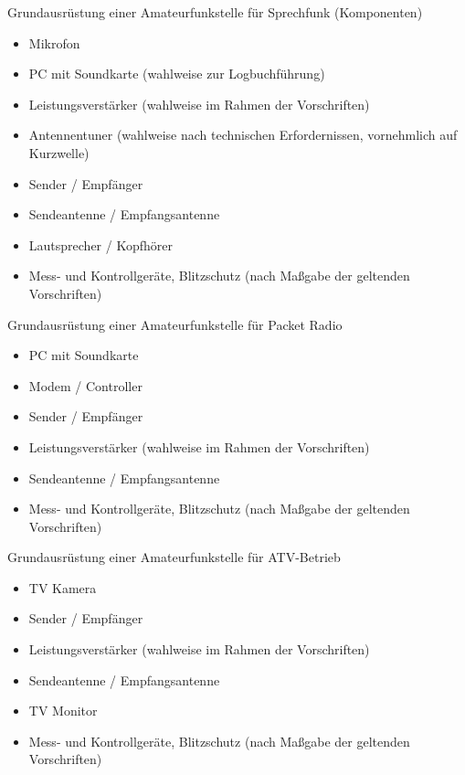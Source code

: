 \documentclass[avery5371,grid,frame,a4paper]{flashcards}
\newcommand{\card}[3]{
  \begin{flashcard}[{\chap} -- #1]{#2}#3\end{flashcard}
}
\begin{document}
\card{38}{Grundausrüstung einer Amateurfunkstelle für Sprechfunk (Komponenten)}{
  \footnotesize
  \begin{minipage}{0.49\textwidth}
    \begin{itemize}
      \item Mikrofon
      \item PC mit Soundkarte (wahlweise zur Logbuchführung)
      \item Leistungsverstärker (wahlweise im Rahmen der Vorschriften)
      \item Antennentuner (wahlweise nach technischen Erfordernissen, vornehmlich auf Kurzwelle)
    \end{itemize}
  \end{minipage}
  \begin{minipage}{0.5\textwidth}
    \begin{itemize}
      \item Sender / Empfänger
      \item Sendeantenne / Empfangsantenne
      \item Lautsprecher / Kopfhörer
      \item Mess- und Kontrollgeräte, Blitzschutz (nach Maßgabe der geltenden Vorschriften)
    \end{itemize}
  \end{minipage}
}
\card{39}{Grundausrüstung einer Amateurfunkstelle für Packet Radio}{
  \begin{itemize}
    \item PC mit Soundkarte
    \item Modem / Controller
    \item Sender / Empfänger
    \item Leistungsverstärker (wahlweise im Rahmen der Vorschriften)
    \item Sendeantenne / Empfangsantenne
    \item Mess- und Kontrollgeräte, Blitzschutz (nach Maßgabe der geltenden Vorschriften)
  \end{itemize}
}
\card{40}{Grundausrüstung einer Amateurfunkstelle für ATV-Betrieb}{
  \begin{itemize}
    \item TV Kamera
    \item Sender / Empfänger
    \item Leistungsverstärker (wahlweise im Rahmen der Vorschriften)
    \item Sendeantenne / Empfangsantenne
    \item TV Monitor
    \item Mess- und Kontrollgeräte, Blitzschutz (nach Maßgabe der geltenden Vorschriften)
  \end{itemize}
}
\end{document}
